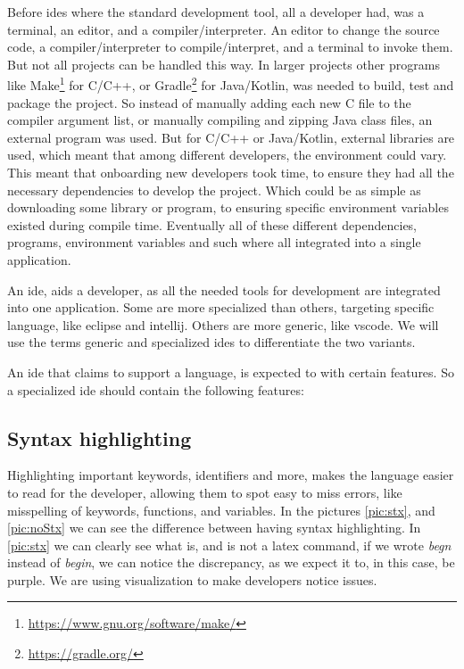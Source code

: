 Before \gls*{ide}s where the standard development tool, all a developer had, was
a terminal, an editor, and a compiler/interpreter. An editor to change the
source code, a compiler/interpreter to compile/interpret, and a terminal to
invoke them. But not all projects can be handled this way. In larger projects
other programs like
Make\footnote{\url{https://www.gnu.org/software/make/}} for C/C++, or
Gradle\footnote{\url{https://gradle.org/}} for Java/Kotlin, was needed to
build, test and package the project. So instead of manually adding each new C
file to the compiler argument list, or manually compiling and zipping Java class
files, an external program was used. But for C/C++ or Java/Kotlin, external
libraries are used, which meant that among different developers, the environment
could vary. This meant that onboarding new developers took time, to ensure they
had all the necessary dependencies to develop the project. Which could be as
simple as downloading some library or program, to ensuring specific environment
variables existed during compile time. Eventually all of these different
dependencies, programs, environment variables and such where all integrated into
a single application.

An \gls*{ide}, aids a developer, as all the needed tools for development are
integrated into one application. Some are more specialized than others,
targeting specific language, like \gls*{eclipse} and \gls*{intellij}. Others are
more generic, like \gls*{vscode}. We will use the terms generic and specialized
\gls*{ide}s to differentiate the two variants.

An \gls*{ide} that claims to support a language, is expected to with certain
features. So a specialized \gls*{ide} should contain the following features:

\subsection{Syntax highlighting}

Highlighting important keywords, identifiers and more, makes the language easier
to read for the developer, allowing them to spot easy to miss errors, like
misspelling of keywords, functions, and variables. In the pictures
\ref{pic:stx}, and \ref{pic:noStx} we can see the difference between having
syntax highlighting. In \ref{pic:stx} we can clearly see what is, and is not a
latex command, if we wrote \textit{begn} instead of \textit{begin}, we can
notice the discrepancy, as we expect it to, in this case, be purple. We are
using visualization to make developers notice issues.


